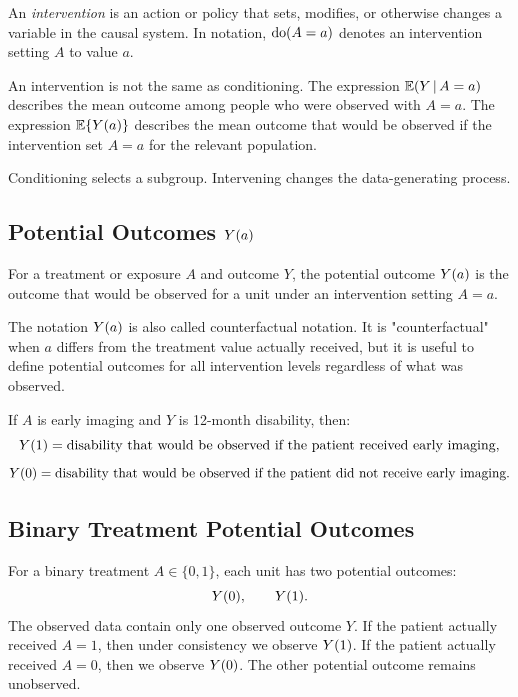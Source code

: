 \begin{definition}[Intervention]
An \emph{intervention} is an action or policy that sets, modifies, or otherwise changes a variable in the causal system. In notation, $\operatorname{do}(A=a)$ denotes an intervention setting $A$ to value $a$.
\end{definition}

An intervention is not the same as conditioning. The expression $\mathbb{E}(Y\,\vert\, A=a)$ describes the mean outcome among people who were observed with $A=a$. The expression $\mathbb{E}\{Y(a)\}$ describes the mean outcome that would be observed if the intervention set $A=a$ for the relevant population.

Conditioning selects a subgroup. Intervening changes the data-generating process.

\subsection{Potential Outcomes $Y(a)$}

\begin{definition}
For a treatment or exposure $A$ and outcome $Y$, the potential outcome $Y(a)$ is the outcome that would be observed for a unit under an intervention setting $A=a$.
\end{definition}

The notation $Y(a)$ is also called counterfactual notation. It is "counterfactual" when $a$ differs from the treatment value actually received, but it is useful to define potential outcomes for all intervention levels regardless of what was observed.

If $A$ is early imaging and $Y$ is 12-month disability, then:
\[
Y(1) = \text{disability that would be observed if the patient received early imaging},
\]
\[
Y(0) = \text{disability that would be observed if the patient did not receive early imaging}.
\]

\subsection{Binary Treatment Potential Outcomes}

For a binary treatment $A\in\{0,1\}$, each unit has two potential outcomes:
\[
Y(0),\qquad Y(1).
\]
The observed data contain only one observed outcome $Y$. If the patient actually received $A=1$, then under consistency we observe $Y(1)$. If the patient actually received $A=0$, then we observe $Y(0)$. The other potential outcome remains unobserved.

